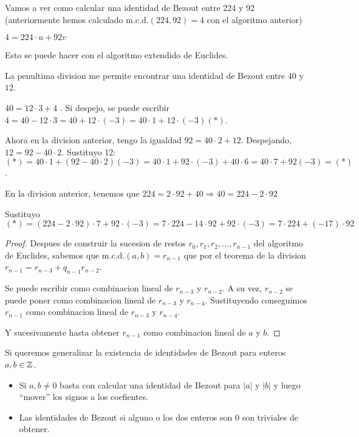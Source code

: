 \begin{example}
	Vamos a ver como calcular una identidad de Bezout entre 224 y 92 (anteriormente hemos calculado \(\mathrm{m.c.d.}(224,92) = 4	 \) con el algoritmo anterior)
	
	\(4 = 224 \cdot u + 92 v \)
	
	Esto se puede hacer con el algoritmo extendido de Euclides.
	
	La penultima division me permite encontrar una identidad de Bezout entre \(40 \) y \(12 \).
	
	\(40 = 12 \cdot 3 + 4 \) . Si despejo, se puede escribir \(4 = 40 - 12 \cdot 3 = 40 + 12 \cdot (-3) = 40 \cdot 1 + 12 \cdot (-3) (*)\).
	
	Ahora en la division anterior, tengo la igualdad \(92 = 40 \cdot 2 + 12 \). Despejando, \(12 = 92 - 40 \cdot 2 \). Sustituyo 12: \((*) = 40 \cdot 1 + (92 - 40 \cdot 2)(-3) = 40 \cdot 1 + 92 \cdot (-3) + 40 \cdot 6 = 40 \cdot 7 + 92 (-3) = (*)\).
	
	En la division anterior, tenemos que \(224 = 2 \cdot 92 + 40 \Rightarrow 40 = 224 - 2 \cdot 92\)
	
	Sustituyo
	\[
		(*) = (224 - 2 \cdot 92) \cdot 7 + 92 \cdot (-3) = 7 \cdot 224 - 14 \cdot 92 + 92 \cdot (-3) = 7 \cdot 224 + (-17) \cdot 92
	\]
\end{example}

\begin{proof}
	Despues de construir la sucesion de restos \(r_0, r_1, r_2, \ldots, r_{n-1 }\) del algoritmo de Euclides, sabemos que \(\mathrm{m.c.d.}(a,b) = r_{n-1} \) que por el teorema de la division \(r_{n-1} = r_{n-3} + q_{n-1} r_{n-2}\).
	
	Se puede escribir como combinacion lineal de \(r_{n-3} \) y \(r_{n-2}\). A su vez, \(r_{n-2 }\) se puede poner como combinacion lineal de \(r_{n-3}\) y \(r_{n-4}\). Sustituyendo conseguimos \(r_{n-1}\) como combinacion lineal de \(r_{n-3}\) y \(r_{n-4}\).
	
	Y sucesivamente hasta obtener \(r_{n-1}\) como combinacion lineal de \(a \) y \(b \).
\end{proof}

\begin{remark}
	Si queremos generalizar la existencia de identidades de Bezout para enteros \(a,b \in \mathbb{Z} \).
	\begin{itemize}
		\item Si \(a,b \neq 0 \) basta con calcular una identidad de Bezout para \(|a| \) y \(|b| \) y luego ``mover'' los signos a los coefientes.
		\item Las identidades de Bezout si alguno o los dos enteros son 0 son triviales de obtener.
	\end{itemize}
\end{remark}

